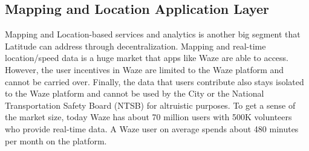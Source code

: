 %
%
%
%
%
%
%
%

\subsection{Mapping and Location Application Layer}

Mapping and Location-based services and analytics is another big segment that Latitude can address through
decentralization. Mapping and real-time location/speed data is a huge market that apps like Waze are able to access.
However, the user incentives in Waze are limited to the Waze platform and cannot be carried over. Finally, the data that
users contribute also stays isolated to the Waze platform and cannot be used by the City or the National Transportation
Safety Board (NTSB) for altruistic purposes. To get a sense of the market size, today Waze has about 70 million users
with 500K volunteers who provide real-time data. A Waze user on average spends about 480 minutes per month on the
platform.

